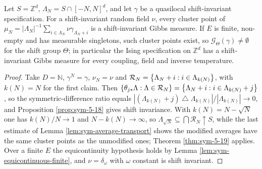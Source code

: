 \begin{example}
    \label{ex:sym-5-20-1}
    \leanok

    Let $S = \mathbb{Z}^d$, $\Lambda_N = S \cap [-N,N]^d$, and let $\gamma$ be a quasilocal
    shift-invariant specification. For a shift-invariant random field $\nu$, every cluster
    point of
    $\mu_N = |\Lambda_N|^{-1}\sum_{i \in \Lambda_N} \nu\gamma_{\Lambda_N + i}$
    is a shift-invariant Gibbs measure. If $E$ is finite, non-empty and has measurable
    singletons, such cluster points exist, so
    $\mathcal{G}_\Theta(\gamma) \neq \emptyset$ for the shift group $\Theta$; in particular the
    Ising specification on $\mathbb{Z}^d$ has a shift-invariant Gibbs measure for every
    coupling, field and inverse temperature.
\end{example}
\begin{proof}
    \leanok

    Take $D = \mathbb{N}$, $\gamma^N = \gamma$, $\nu_N = \nu$ and
    $\mathcal{R}_N = \left\{ \Lambda_N + i : i \in \Lambda_{k(N)} \right\}$, with $k(N) = N$ for the
    first claim. Then
    $\left\{ \theta_{j*}\Lambda : \Lambda \in \mathcal{R}_N \right\} = \left\{ \Lambda_N + i :
    i \in \Lambda_{k(N)} + j \right\}$, so the symmetric-difference ratio equals
    $|(\Lambda_{k(N)} + j) \mathbin{\triangle} \Lambda_{k(N)}| / |\Lambda_{k(N)}| \to 0$, and
    Proposition \ref{prop:sym-5-18} gives shift invariance. With $k(N) = N - \sqrt{N}$ one has
    $k(N)/N \to 1$ and $N - k(N) \to \infty$, so $\Lambda_{\sqrt N} \subseteq
    \bigcap \mathcal{R}_N \uparrow S$, while the last estimate of
    Lemma \ref{lem:sym-average-transport} shows the modified averages have the same cluster
    points as the unmodified ones; Theorem \ref{thm:sym-5-19} applies. Over a finite $E$ the
    equicontinuity hypothesis holds by Lemma \ref{lem:sym-equicontinuous-finite}, and
    $\nu = \delta_\omega$ with $\omega$ constant is shift invariant.
\end{proof}

